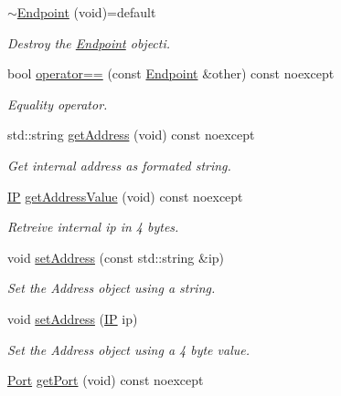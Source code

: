 \begin{DoxyCompactItemize}
\mbox{\hyperlink{classo_z_1_1_endpoint_ae48da5e193017cb119233761406e7d54}{$\sim$\+Endpoint}} (void)=default
\begin{DoxyCompactList}\small\item\em Destroy the \mbox{\hyperlink{classo_z_1_1_endpoint}{Endpoint}} objecti. \end{DoxyCompactList}\item 
bool \mbox{\hyperlink{classo_z_1_1_endpoint_ab5a405bf455ab2f4e28458b0ba69d399}{operator==}} (const \mbox{\hyperlink{classo_z_1_1_endpoint}{Endpoint}} \&other) const noexcept
\begin{DoxyCompactList}\small\item\em Equality operator. \end{DoxyCompactList}\item 
std\+::string \mbox{\hyperlink{classo_z_1_1_endpoint_a27a680dbcdf1c89bb10fcbaca969edab}{get\+Address}} (void) const noexcept
\begin{DoxyCompactList}\small\item\em Get internal address as formated string. \end{DoxyCompactList}\item 
\mbox{\hyperlink{namespaceo_z_ace55c2d0182a14ceea9649d0d0cf9c4a}{IP}} \mbox{\hyperlink{classo_z_1_1_endpoint_ad02055ec457231d4d0f316dcfa5539ba}{get\+Address\+Value}} (void) const noexcept
\begin{DoxyCompactList}\small\item\em Retreive internal ip in 4 bytes. \end{DoxyCompactList}\item 
void \mbox{\hyperlink{classo_z_1_1_endpoint_a90caf5f6497ec5a09b34d7a6069502da}{set\+Address}} (const std\+::string \&ip)
\begin{DoxyCompactList}\small\item\em Set the Address object using a string. \end{DoxyCompactList}\item 
void \mbox{\hyperlink{classo_z_1_1_endpoint_a7259041c3bef1408d9a8c85c67a7b378}{set\+Address}} (\mbox{\hyperlink{namespaceo_z_ace55c2d0182a14ceea9649d0d0cf9c4a}{IP}} ip)
\begin{DoxyCompactList}\small\item\em Set the Address object using a 4 byte value. \end{DoxyCompactList}\item 
\mbox{\hyperlink{namespaceo_z_afeccb82d451972ba3b7d2a32b066b30b}{Port}} \mbox{\hyperlink{classo_z_1_1_endpoint_aad983948594b295187d6117f99b1988d}{get\+Port}} (void) const noexcept

\end{DoxyCompactItemize}
